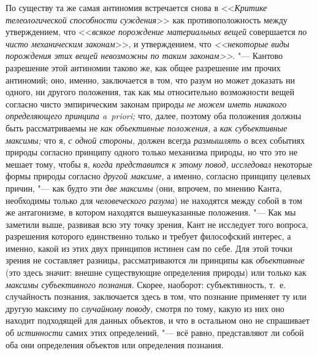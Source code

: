 По существу та же самая антиномия встречается снова в <<{\em Критике
телеологической способности суждения}>> как противоположность между
утверждением, что <<{\em всякое порождение материальных вещей} совершается
{\em по чисто механическим законам}>>, и утверждением, что
{\em <<некоторые виды порождения этих вещей невозможны по таким
законам>>}.
"--- Кантово разрешение этой антиномии таково же, как общее
разрешение им прочих антиномий; оно, именно, заключается в том, что разум
но может доказать ни одного, ни другого положения, так как мы относительно
возможности вещей согласно чисто эмпирическим законам природы
{\em не можем иметь никакого
определяющего принципа a~priori;} что, далее, поэтому оба
положения должны быть рассматриваемы не
{\em как объективные положения,} а {\em как субъективные
максимы;} что я, {\em с одной стороны,} должен всегда {\em размышлять} о всех
событиях природы согласно принципу одного только механизма природы, но что
это не мешает тому, чтобы я, {\em когда представится к этому повод,}
{\em исследовал} некоторые формы природы согласно {\em другой
максиме,} а именно, согласно принципу целевых причин, "--- как будто эти
{\em две максимы} (они, впрочем, по мнению Канта, необходимы только
для {\em человеческого разума})
не находятся между собой в том же антагонизме, в котором
находятся вышеуказанные положения. "--- Как мы заметили выше,
развивая всю эту точку зрения, Кант не исследует того вопроса, разрешения
которого единственно только и требует философский интерес, а именно, какой
из этих двух принципов истинен сам по себе. Для этой точки зрения не
составляет разницы, рассматриваются ли принципы как {\em объективные} (это
здесь значит: внешне существующие определения природы) или только как
{\em максимы субъективного познания}.
Скорее, наоборот: субъективность, т.~е. случайность познания,
заключается здесь в том, что познание применяет ту или другую максиму по
{\em случайному поводу,} смотря по тому, какую из них оно находит подходящей
для данных объектов, и что в остальном оно не спрашивает об {\em истинности}
самих этих определений, "--- всё равно, представляют ли собой оба они
определения объектов или определения познания.

